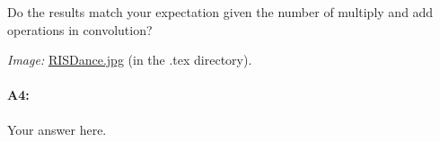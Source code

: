 Do the results match your expectation given the number of multiply and add operations in convolution?

\emph{Image:} \href{RISDance.jpg}{RISDance.jpg} (in the .tex directory).

\paragraph{A4:} Your answer here.









